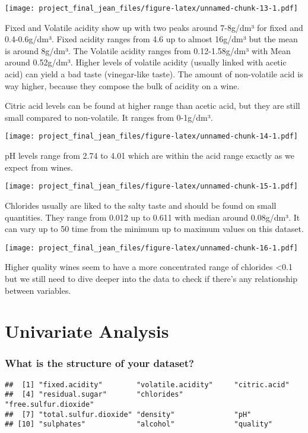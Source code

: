\documentclass[]{article}
\begin{document}
\texttt{[image: project\_final\_jean\_files/figure-latex/unnamed-chunk-13-1.pdf]}

Fixed and Volatile acidity show up with two peaks around 7-8g/dm³ for
fixed and 0.4-0.6g/dm³. Fixed acidity ranges from 4.6 up to almost
16g/dm³ but the mean is around 8g/dm³. The Volatile acidity ranges from
0.12-1.58g/dm³ with Mean around 0.52g/dm³. Higher levels of volatile
acidity (usually linked with acetic acid) can yield a bad taste
(vinegar-like taste). The amount of non-volatile acid is way higher,
because they compose the bulk of acidity on a wine.

Citric acid levels can be found at higher range than acetic acid, but
they are still small compared to non-volatile. It ranges from 0-1g/dm³.

\texttt{[image: project\_final\_jean\_files/figure-latex/unnamed-chunk-14-1.pdf]}

pH levels range from 2.74 to 4.01 which are within the acid range
exactly as we expect from wines.

\texttt{[image: project\_final\_jean\_files/figure-latex/unnamed-chunk-15-1.pdf]}

Chlorides usually are liked to the salty taste and should be found on
small quantities. They range from 0.012 up to 0.611 with median around
0.08g/dm³. It can vary up to 50 time from the minimum up to maximum
values on this dataset.

\texttt{[image: project\_final\_jean\_files/figure-latex/unnamed-chunk-16-1.pdf]}

Higher quality wines seem to have a more concentrated range of chlorides
\textless{}0.1 but we still need to dive deeper into the data to check
if there's any relationship between variables.

\hypertarget{univariate-analysis}{%
\section{Univariate Analysis}\label{univariate-analysis}}

\hypertarget{what-is-the-structure-of-your-dataset}{%
\subsubsection{What is the structure of your
dataset?}\label{what-is-the-structure-of-your-dataset}}

\begin{verbatim}
##  [1] "fixed.acidity"        "volatile.acidity"     "citric.acid"         
##  [4] "residual.sugar"       "chlorides"            "free.sulfur.dioxide" 
##  [7] "total.sulfur.dioxide" "density"              "pH"                  
## [10] "sulphates"            "alcohol"              "quality"
\end{verbatim}
\end{document}

